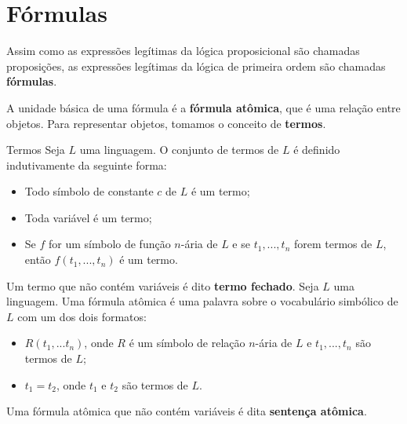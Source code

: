 \section{Fórmulas}

Assim como as expressões legítimas da lógica proposicional são chamadas proposições, as expressões legítimas da lógica de primeira ordem são chamadas \textbf{fórmulas}.

A unidade básica de uma fórmula é a \textbf{fórmula atômica}, que é uma relação entre objetos. Para representar objetos, tomamos o conceito de \textbf{termos}.
\begin{definition}{Termos}
    Seja $L$ uma linguagem. O conjunto de termos de $L$ é definido indutivamente da seguinte forma:
    \begin{itemize}
        \item Todo símbolo de constante $c$ de $L$ é um termo;
        \item Toda variável é um termo;
        \item Se $f$ for um símbolo de função $n$-ária de $L$ e se $t_1,...,t_n$ forem termos de $L$, então $f(t_1,...,t_n)$ é um termo. 
    \end{itemize}
    Um termo que não contém variáveis é dito \textbf{termo fechado}.
    Seja $L$ uma linguagem. Uma fórmula atômica é uma palavra sobre o vocabulário simbólico de $L$ com um dos dois formatos:
    \begin{itemize}
        \item $R(t_1,...t_n)$, onde $R$ é um símbolo de relação $n$-ária de $L$ e $t_1,...,t_n$ são termos de $L$;
        \item $t_1 = t_2$, onde $t_1$ e $t_2$ são termos de $L$.
    \end{itemize} 
    Uma fórmula atômica que não contém variáveis é dita \textbf{sentença atômica}.
\end{definition}

